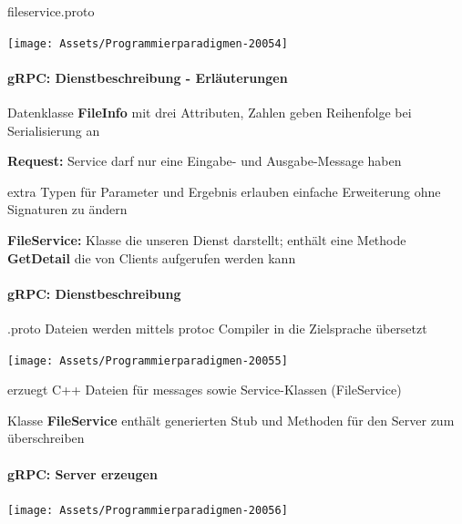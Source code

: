 \documentclass[10pt]{article}
\begin{document}
fileservice.proto
\begin{center}
  \centering
  \texttt{[image: Assets/Programmierparadigmen-20054]}
\end{center}

\paragraph{gRPC: Dienstbeschreibung - Erläuterungen}

\begin{itemize*}
  \item Datenklasse \textbf{FileInfo} mit drei Attributen, Zahlen geben Reihenfolge bei Serialisierung an
  \item \textbf{Request:} Service darf nur eine Eingabe- und Ausgabe-Message haben
  \begin{itemize*}
    \item extra Typen für Parameter und Ergebnis erlauben einfache Erweiterung ohne Signaturen zu ändern
  \end{itemize*}
  \item \textbf{FileService:} Klasse die unseren Dienst darstellt; enthält eine Methode \textbf{GetDetail} die von Clients aufgerufen werden kann
\end{itemize*}

\paragraph{gRPC: Dienstbeschreibung}

\begin{itemize*}
  \item *.proto Dateien werden mittels protoc Compiler in die Zielsprache übersetzt
  \begin{center}
    \centering
    \texttt{[image: Assets/Programmierparadigmen-20055]}
  \end{center}
  \item erzuegt C++ Dateien für messages sowie Service-Klassen (FileService)
  \item Klasse \textbf{FileService} enthält generierten Stub und  Methoden für den Server zum überschreiben
\end{itemize*}

\paragraph{gRPC: Server erzeugen}

\begin{center}
  \centering
  \texttt{[image: Assets/Programmierparadigmen-20056]}
\end{center}
\end{document}
